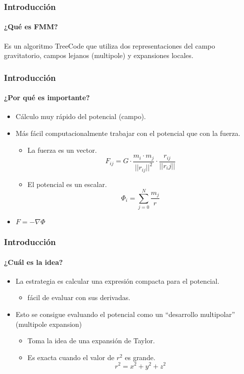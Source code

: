 \begin{frame}
    \frametitle{Introducción}
    \framesubtitle{¿Qué es FMM?}

    \begin{center}
        Es un algoritmo TreeCode que utiliza dos representaciones del campo gravitatorio,
        campos lejanos (multipole) y expansiones locales.
    \end{center}
\end{frame}

\begin{frame}
    \frametitle{Introducción}
    \framesubtitle{¿Por qué es importante?}

    \begin{itemize}
        \item Cálculo muy rápido del potencial (campo).
        \item Más fácil computacionalmente trabajar con el potencial que con la fuerza.
        \begin{itemize}
            \item La fuerza es un vector. $$F_{ij} =G \cdot \frac{m_i \cdot m_j}{||r_{ij}||^{2}} \cdot \frac{r_{ij}}{||r_ij||}$$
            \item El potencial es un escalar. $$\Phi_{i} = \sum_{j=0}^{N} \frac{m_{j}}{r}$$
        \end{itemize}
        \item $F = - \nabla \Phi $
    \end{itemize}
\end{frame}


\begin{frame}
    \frametitle{Introducción}
    \framesubtitle{¿Cuál es la idea?}

    \begin{itemize}
        \item La estrategia es calcular una expresión compacta para el potencial.
        \begin{itemize}
            \item fácil de evaluar con sus derivadas.
        \end{itemize}
        \item Esto se consigue evaluando el potencial como un ``desarrollo multipolar'' (multipole expansion)
        \begin{itemize}
            \item Toma la idea de una expansión de Taylor.
            \item Es exacta cuando el valor de $r^2$ es grande.
                $$r^{2} = x^{2} + y^{2} + z^{2}$$
        \end{itemize}
    \end{itemize}
\end{frame}

